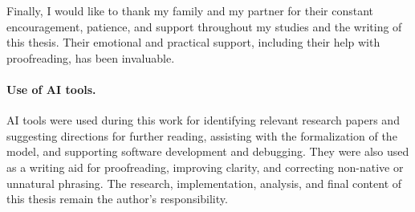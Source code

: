 Finally, I would like to thank my family and my partner for their constant encouragement, patience, and support throughout my studies and the writing of this thesis. Their emotional and practical support, including their help with proofreading, has been invaluable.

\paragraph{Use of AI tools.}
AI tools were used during this work for identifying relevant research papers and suggesting directions for further reading, assisting with the formalization of the model, and supporting software development and debugging. They were also used as a writing aid for proofreading, improving clarity, and correcting non-native or unnatural phrasing. The research, implementation, analysis, and final content of this thesis remain the author's responsibility.

\clearpage